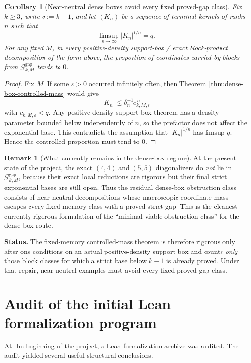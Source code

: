 \documentclass[11pt]{article}
\newtheorem{corollary}[theorem]{Corollary}
\theoremstyle{definition}
\newtheorem{remark}[theorem]{Remark}
\newcommand{\eps}{\varepsilon}
\newcommand{\1}{\mathbf{1}}
\newcommand{\status}[1]{\par\smallskip\noindent\textbf{Status.} #1\par\smallskip}
\begin{document}
\begin{corollary}[Near-neutral dense boxes avoid every fixed proved-gap class]\label{cor:dense-box-controlled-mass}
Fix $k\ge 3$, write $q:=k-1$, and let $(K_n)$ be a sequence of terminal kernels of ranks $n$ such that
\[
\limsup_{n\to\infty}|K_n|^{1/n}=q.
\]
For any fixed $M$, in every positive-density support-box / exact block-product decomposition of the form above, the proportion of coordinates carried by blocks from $\mathcal G_{k,M}^{\mathrm{gap}}$ tends to $0$.
\end{corollary}

\begin{proof}
Fix $M$. If some $\eps>0$ occurred infinitely often, then Theorem~\ref{thm:dense-box-controlled-mass} would give
\[
|K_n|\le \delta_n^{-1} c_{k,M,\eps}^{\,n}
\]
with $c_{k,M,\eps}<q$. Any positive-density support-box theorem has a density parameter bounded below independently of $n$, so the prefactor does not affect the exponential base. This contradicts the assumption that $|K_n|^{1/n}$ has limsup $q$. Hence the controlled proportion must tend to $0$.
\end{proof}

\begin{remark}[What currently remains in the dense-box regime]\label{rem:dense-box-residual-class}
At the present state of the project, the exact $(4,4)$ and $(5,5)$ diagonalizers do \emph{not} lie in $\mathcal G_{k,M}^{\mathrm{gap}}$, because their exact local reductions are rigorous but their final strict exponential bases are still open. Thus the residual dense-box obstruction class consists of near-neutral decompositions whose macroscopic coordinate mass escapes every fixed-memory class with a proved strict gap. This is the cleanest currently rigorous formulation of the ``minimal viable obstruction class'' for the dense-box route.
\end{remark}

\status{The fixed-memory controlled-mass theorem is therefore rigorous only after one conditions on an actual positive-density support box and counts \emph{only} those block classes for which a strict base below $k-1$ is already proved. Under that repair, near-neutral examples must avoid every fixed proved-gap class.}


\section{Audit of the initial Lean formalization program}\label{sec:lean-audit}
At the beginning of the project, a Lean formalization archive was audited. The audit yielded several useful structural conclusions.
\end{document}
